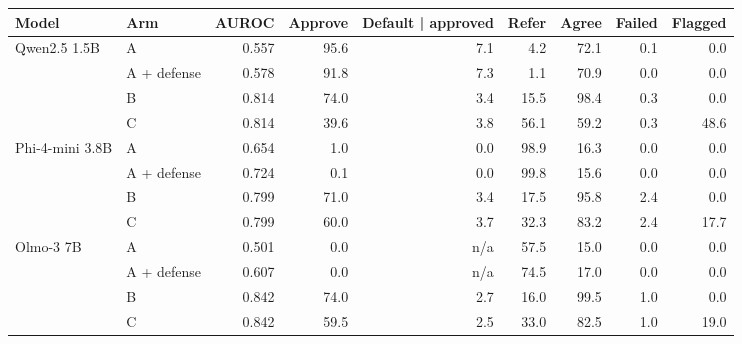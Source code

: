 \begin{tabular}{llrrrrrrr}
\toprule
Model & Arm & AUROC & Approve & Default | approved & Refer & Agree & Failed & Flagged \\
\midrule
Qwen2.5 1.5B & A & 0.557 & 95.6 & 7.1 & 4.2 & 72.1 & 0.1 & 0.0 \\
 & A + defense & 0.578 & 91.8 & 7.3 & 1.1 & 70.9 & 0.0 & 0.0 \\
 & B & 0.814 & 74.0 & 3.4 & 15.5 & 98.4 & 0.3 & 0.0 \\
 & C & 0.814 & 39.6 & 3.8 & 56.1 & 59.2 & 0.3 & 48.6 \\
Phi-4-mini 3.8B & A & 0.654 & 1.0 & 0.0 & 98.9 & 16.3 & 0.0 & 0.0 \\
 & A + defense & 0.724 & 0.1 & 0.0 & 99.8 & 15.6 & 0.0 & 0.0 \\
 & B & 0.799 & 71.0 & 3.4 & 17.5 & 95.8 & 2.4 & 0.0 \\
 & C & 0.799 & 60.0 & 3.7 & 32.3 & 83.2 & 2.4 & 17.7 \\
Olmo-3 7B & A & 0.501 & 0.0 & n/a & 57.5 & 15.0 & 0.0 & 0.0 \\
 & A + defense & 0.607 & 0.0 & n/a & 74.5 & 17.0 & 0.0 & 0.0 \\
 & B & 0.842 & 74.0 & 2.7 & 16.0 & 99.5 & 1.0 & 0.0 \\
 & C & 0.842 & 59.5 & 2.5 & 33.0 & 82.5 & 1.0 & 19.0 \\
\bottomrule
\end{tabular}
